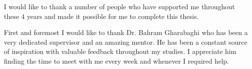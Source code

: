 \begin{acknowledgements}\label{acknow}
\dsp

I would like to thank a number of people who have supported me throughout these 4 years and made it possible for me to complete this thesis.  

First and foremost I would like to thank Dr. Bahram Gharabaghi who has been a very dedicated supervisor and an amazing mentor. He has been a constant source of inspiration with valuable feedback throughout my studies. I appreciate him finding the time to meet with me every week and whenever I required help. 



\end{acknowledgements}
\dsp
